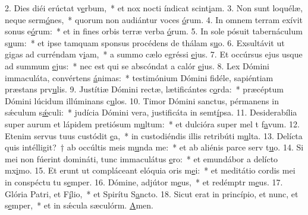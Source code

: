 2. Dies diéi erúctat v\uline{e}rbum,~* et nox nocti índicat scint\uline{i}am.
3. Non sunt loquélæ, neque serm\uline{ó}nes,~* quorum non audiántur voces \uline{ó}rum.
4. In omnem terram exívit sonus e\uline{ó}rum:~* et in fines orbis terræ verba \uline{ó}rum.
5. In sole pósuit tabernáculum s\uline{u}um:~* et ipse tamquam sponsus procédens de thálam s\uline{u}o.
6. Exsultávit ut gigas ad curréndam v\uline{i}am,~* a summo cælo egréssi \uline{e}jus.
7. Et occúrsus ejus usque ad summum \uline{e}jus:~* nec est qui se abscóndat a calór \uline{e}jus.
8. Lex Dómini immaculáta, convértens \uline{á}nimas:~* testimónium Dómini fidéle, sapiéntiam præstans prv\uline{u}lis.
9. Justítiæ Dómini rectæ, lætificántes c\uline{o}rda:~* præcéptum Dómini lúcidum illúminans c\uline{u}los.
10. Timor Dómini sanctus, pérmanens in sǽculum s\uline{ǽ}culi:~* judícia Dómini vera, justificáta in semt\uline{í}psa.
11. Desiderabília super aurum et lápidem pretiósum m\uline{u}ltum:~* et dulcióra super mel t f\uline{a}vum.
12. Etenim servus tuus custódit \uline{e}a,~* in custodiéndis illis retribúti m\uline{u}lta.
13. Delícta quis intélligit?~† ab occúltis meis m\uline{u}nda me:~* et ab aliénis parce serv t\uline{u}o.
14. Si mei non fúerint domináti, tunc immaculátus \uline{e}ro:~* et emundábor a delícto mx\uline{i}mo.
15. Et erunt ut compláceant elóquia oris m\uline{e}i:~* et meditátio cordis mei in conspéctu tu s\uline{e}mper.
16. Dómine, adjútor m\uline{e}us,~* et redémptr m\uline{e}us.
17. Glória Patri, et F\uline{í}lio,~* et Spirítu S\uline{a}ncto.
18. Sicut erat in princípio, et nunc, et s\uline{e}mper,~* et in sǽcula sæculórm. \uline{A}men.
